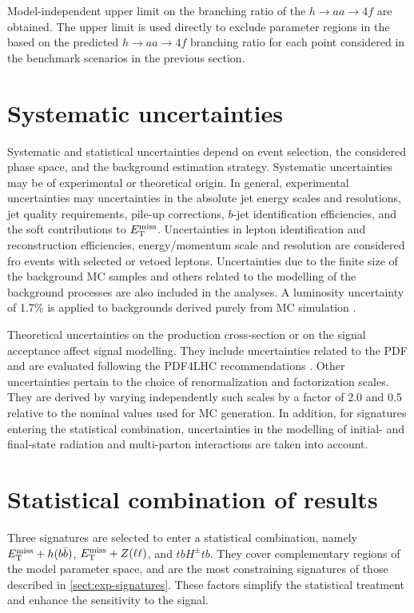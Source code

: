 Model-independent upper limit on the branching ratio of the $h\rightarrow aa \rightarrow 4f$ are obtained. The upper limit is used directly to exclude parameter regions in the \thdma based on the predicted $h\rightarrow aa \rightarrow 4f$ branching ratio for each point considered in the benchmark scenarios in the previous section. 


\section{Systematic uncertainties}
\label{sect:systematic-uncertainties}

Systematic and statistical uncertainties depend on event selection, the considered phase space, and the background estimation strategy. Systematic uncertainties may be of experimental or theoretical origin. In general, experimental uncertainties may uncertainties in the absolute jet energy scales and resolutions, jet quality requirements, pile-up corrections, $b$-jet identification efficiencies, and the soft contributions to $E_{\mathrm{T}}^{\mathrm{miss}}$. Uncertainties in lepton identification and reconstruction efficiencies, energy/momentum scale and resolution are considered fro events with selected or vetoed leptons. Uncertainties due to the finite size of the background MC samples and others related to the modelling of the background processes are also included in the analyses. A luminosity uncertainty of 1.7\% is applied to backgrounds derived purely from MC simulation \cite{ATLAS-CONF-2019-021}. 

Theoretical uncertainties on the production cross-section or on the signal acceptance affect signal modelling. They include uncertainties related to the PDF and are evaluated following the PDF4LHC recommendations \cite{Butterworth:2015oua}. Other uncertainties pertain to the choice of renormalization and factorization scales. They are derived by varying independently such scales by a factor of 2.0 and 0.5 relative to the nominal values used for MC generation. In addition, for signatures entering the statistical combination, uncertainties in the modelling of initial- and final-state radiation and multi-parton interactions are taken into account. 

\section{Statistical combination of results}
\label{sect:stat}
Three \thdma signatures are selected to enter a statistical combination, namely $E_{\mathrm{T}}^{\mathrm{miss}}+h(b\bar{b})$, $E_{\mathrm{T}}^{\mathrm{miss}}+Z(\ell\ell)$, and $tbH^{\pm}tb$. They cover complementary regions of the model parameter space, and are the most constraining signatures of those described in \ref{sect:exp-signatures}. These factors simplify the statistical treatment and enhance the sensitivity to the \thdma signal.

